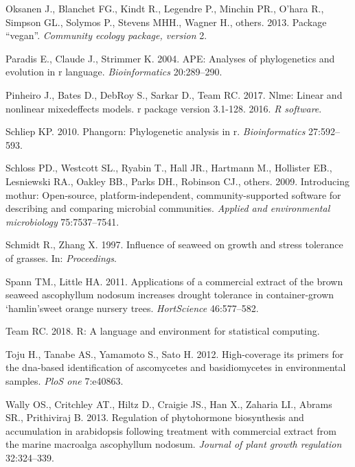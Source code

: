 \documentclass[11pt,]{article}
\begin{document}
\hypertarget{ref-oksanen2013package}{}
Oksanen J., Blanchet FG., Kindt R., Legendre P., Minchin PR., O'hara R.,
Simpson GL., Solymos P., Stevens MHH., Wagner H., others. 2013. Package
``vegan''. \emph{Community ecology package, version} 2.

\hypertarget{ref-paradis2004ape}{}
Paradis E., Claude J., Strimmer K. 2004. APE: Analyses of phylogenetics
and evolution in r language. \emph{Bioinformatics} 20:289--290.

\hypertarget{ref-pinheiro2017nlme}{}
Pinheiro J., Bates D., DebRoy S., Sarkar D., Team RC. 2017. Nlme: Linear
and nonlinear mixedeffects models. r package version 3.1-128. 2016.
\emph{R software}.

\hypertarget{ref-schliep2010phangorn}{}
Schliep KP. 2010. Phangorn: Phylogenetic analysis in r.
\emph{Bioinformatics} 27:592--593.

\hypertarget{ref-schloss2009introducing}{}
Schloss PD., Westcott SL., Ryabin T., Hall JR., Hartmann M., Hollister
EB., Lesniewski RA., Oakley BB., Parks DH., Robinson CJ., others. 2009.
Introducing mothur: Open-source, platform-independent,
community-supported software for describing and comparing microbial
communities. \emph{Applied and environmental microbiology}
75:7537--7541.

\hypertarget{ref-schmidt1997influence}{}
Schmidt R., Zhang X. 1997. Influence of seaweed on growth and stress
tolerance of grasses. In: \emph{Proceedings}.

\hypertarget{ref-spann2011applications}{}
Spann TM., Little HA. 2011. Applications of a commercial extract of the
brown seaweed ascophyllum nodosum increases drought tolerance in
container-grown `hamlin'sweet orange nursery trees. \emph{HortScience}
46:577--582.

\hypertarget{ref-team2018r}{}
Team RC. 2018. R: A language and environment for statistical computing.

\hypertarget{ref-toju2012high}{}
Toju H., Tanabe AS., Yamamoto S., Sato H. 2012. High-coverage its
primers for the dna-based identification of ascomycetes and
basidiomycetes in environmental samples. \emph{PloS one} 7:e40863.

\hypertarget{ref-wally2013regulation}{}
Wally OS., Critchley AT., Hiltz D., Craigie JS., Han X., Zaharia LI.,
Abrams SR., Prithiviraj B. 2013. Regulation of phytohormone biosynthesis
and accumulation in arabidopsis following treatment with commercial
extract from the marine macroalga ascophyllum nodosum. \emph{Journal of
plant growth regulation} 32:324--339.
\end{document}
